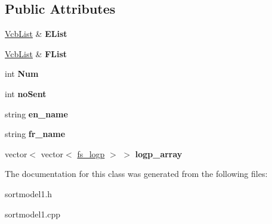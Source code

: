 \subsection*{\-Public \-Attributes}
\begin{DoxyCompactItemize}
\item 
\hypertarget{classSortModel1_a54a87af33bfdc635f4c9a621513babb8}{\hyperlink{classVcbList}{\-Vcb\-List} \& {\bfseries \-E\-List}}\label{classSortModel1_a54a87af33bfdc635f4c9a621513babb8}

\item 
\hypertarget{classSortModel1_a1dc5775034491a60cba887718d4c32ad}{\hyperlink{classVcbList}{\-Vcb\-List} \& {\bfseries \-F\-List}}\label{classSortModel1_a1dc5775034491a60cba887718d4c32ad}

\item 
\hypertarget{classSortModel1_a3420396e92b6dde5e4da8654a8a67dbc}{int {\bfseries \-Num}}\label{classSortModel1_a3420396e92b6dde5e4da8654a8a67dbc}

\item 
\hypertarget{classSortModel1_a5a274c988b94b25de16090e12de49876}{int {\bfseries no\-Sent}}\label{classSortModel1_a5a274c988b94b25de16090e12de49876}

\item 
\hypertarget{classSortModel1_a81301addf805307fa2fbdfa842b5ca47}{string {\bfseries en\-\_\-name}}\label{classSortModel1_a81301addf805307fa2fbdfa842b5ca47}

\item 
\hypertarget{classSortModel1_a4e5a394af2aabdf011ea479d28167600}{string {\bfseries fr\-\_\-name}}\label{classSortModel1_a4e5a394af2aabdf011ea479d28167600}

\item 
\hypertarget{classSortModel1_abfa9c43e975fd9074535ea5d909b8e7e}{vector$<$ vector$<$ \hyperlink{classfs__logp}{fs\-\_\-logp} $>$ $>$ {\bfseries logp\-\_\-array}}\label{classSortModel1_abfa9c43e975fd9074535ea5d909b8e7e}

\end{DoxyCompactItemize}


\-The documentation for this class was generated from the following files\-:\begin{DoxyCompactItemize}
\item 
sortmodel1.\-h\item 
sortmodel1.\-cpp\end{DoxyCompactItemize}
